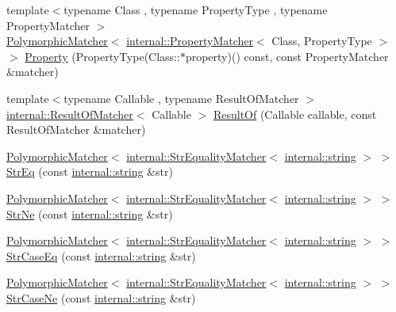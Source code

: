 \begin{DoxyCompactItemize}
\item 
{\footnotesize template$<$typename Class , typename Property\+Type , typename Property\+Matcher $>$ }\\\hyperlink{classtesting_1_1PolymorphicMatcher}{Polymorphic\+Matcher}$<$ \hyperlink{classtesting_1_1internal_1_1PropertyMatcher}{internal\+::\+Property\+Matcher}$<$ Class, Property\+Type $>$ $>$ \hyperlink{namespacetesting_a0fad10571e23f7bc0d5c83d4c31ba740}{Property} (Property\+Type(Class\+::$\ast$property)() const, const Property\+Matcher \&matcher)
\item 
{\footnotesize template$<$typename Callable , typename Result\+Of\+Matcher $>$ }\\\hyperlink{classtesting_1_1internal_1_1ResultOfMatcher}{internal\+::\+Result\+Of\+Matcher}$<$ Callable $>$ \hyperlink{namespacetesting_aaadb51dd383baa95f123ab891d4f8a5f}{Result\+Of} (Callable callable, const Result\+Of\+Matcher \&matcher)
\item 
\hyperlink{classtesting_1_1PolymorphicMatcher}{Polymorphic\+Matcher}$<$ \hyperlink{classtesting_1_1internal_1_1StrEqualityMatcher}{internal\+::\+Str\+Equality\+Matcher}$<$ \hyperlink{namespacetesting_1_1internal_a8e8ff5b11e64078831112677156cb111}{internal\+::string} $>$ $>$ \hyperlink{namespacetesting_a154de81376ae7d584c6e5a619b45fb09}{Str\+Eq} (const \hyperlink{namespacetesting_1_1internal_a8e8ff5b11e64078831112677156cb111}{internal\+::string} \&str)
\item 
\hyperlink{classtesting_1_1PolymorphicMatcher}{Polymorphic\+Matcher}$<$ \hyperlink{classtesting_1_1internal_1_1StrEqualityMatcher}{internal\+::\+Str\+Equality\+Matcher}$<$ \hyperlink{namespacetesting_1_1internal_a8e8ff5b11e64078831112677156cb111}{internal\+::string} $>$ $>$ \hyperlink{namespacetesting_a6f6b8af3d19cb969df0eb995c47a14d2}{Str\+Ne} (const \hyperlink{namespacetesting_1_1internal_a8e8ff5b11e64078831112677156cb111}{internal\+::string} \&str)
\item 
\hyperlink{classtesting_1_1PolymorphicMatcher}{Polymorphic\+Matcher}$<$ \hyperlink{classtesting_1_1internal_1_1StrEqualityMatcher}{internal\+::\+Str\+Equality\+Matcher}$<$ \hyperlink{namespacetesting_1_1internal_a8e8ff5b11e64078831112677156cb111}{internal\+::string} $>$ $>$ \hyperlink{namespacetesting_addbdb8c0902ab09cade24fa6db7c0073}{Str\+Case\+Eq} (const \hyperlink{namespacetesting_1_1internal_a8e8ff5b11e64078831112677156cb111}{internal\+::string} \&str)
\item 
\hyperlink{classtesting_1_1PolymorphicMatcher}{Polymorphic\+Matcher}$<$ \hyperlink{classtesting_1_1internal_1_1StrEqualityMatcher}{internal\+::\+Str\+Equality\+Matcher}$<$ \hyperlink{namespacetesting_1_1internal_a8e8ff5b11e64078831112677156cb111}{internal\+::string} $>$ $>$ \hyperlink{namespacetesting_a9596fd67bdd5df195bc54382f91a1906}{Str\+Case\+Ne} (const \hyperlink{namespacetesting_1_1internal_a8e8ff5b11e64078831112677156cb111}{internal\+::string} \&str)

\end{DoxyCompactItemize}
